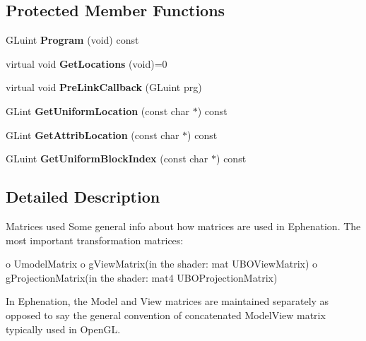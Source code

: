\subsection*{\-Protected \-Member \-Functions}
\begin{DoxyCompactItemize}
\item 
\hypertarget{classShaderBase_a43c4aeb651eaa7d12ffa45c65cb86cc5}{\-G\-Luint {\bfseries \-Program} (void) const }\label{classShaderBase_a43c4aeb651eaa7d12ffa45c65cb86cc5}

\item 
\hypertarget{classShaderBase_abd2bd3d01dce1e25aa10d1f62216ee57}{virtual void {\bfseries \-Get\-Locations} (void)=0}\label{classShaderBase_abd2bd3d01dce1e25aa10d1f62216ee57}

\item 
\hypertarget{classShaderBase_aba35258b10e57c65fb07e3b134f1977e}{virtual void {\bfseries \-Pre\-Link\-Callback} (\-G\-Luint prg)}\label{classShaderBase_aba35258b10e57c65fb07e3b134f1977e}

\item 
\hypertarget{classShaderBase_a09935c4d278aaacbf0a0300e15ee8901}{\-G\-Lint {\bfseries \-Get\-Uniform\-Location} (const char $\ast$) const }\label{classShaderBase_a09935c4d278aaacbf0a0300e15ee8901}

\item 
\hypertarget{classShaderBase_a23ff68011100d7ccbf7beba7c898eed0}{\-G\-Lint {\bfseries \-Get\-Attrib\-Location} (const char $\ast$) const }\label{classShaderBase_a23ff68011100d7ccbf7beba7c898eed0}

\item 
\hypertarget{classShaderBase_a380d68d5caddef1507c81ea9ef83e173}{\-G\-Luint {\bfseries \-Get\-Uniform\-Block\-Index} (const char $\ast$) const }\label{classShaderBase_a380d68d5caddef1507c81ea9ef83e173}

\end{DoxyCompactItemize}


\subsection{\-Detailed \-Description}
\-Matrices used \-Some general info about how matrices are used in \-Ephenation. \-The most important transformation matrices\-: 

o \-Umodel\-Matrix o g\-View\-Matrix(in the shader\-: mat U\-B\-O\-View\-Matrix) o g\-Projection\-Matrix(in the shader\-: mat4 U\-B\-O\-Projection\-Matrix)

\-In \-Ephenation, the \-Model and \-View matrices are maintained separately as opposed to say the general convention of concatenated \-Model\-View matrix typically used in \-Open\-G\-L.

